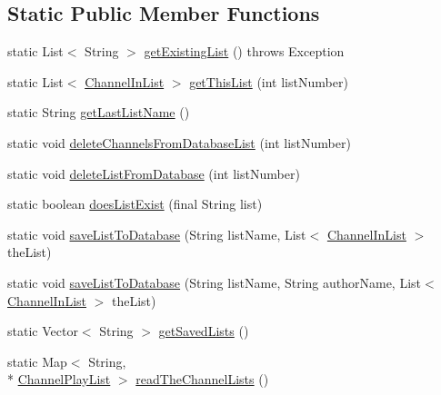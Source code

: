 \subsection*{Static Public Member Functions}
\begin{DoxyCompactItemize}
\item 
static List$<$ String $>$ \hyperlink{classgov_1_1fnal_1_1ppd_1_1dd_1_1db_1_1ListUtilsDatabase_afb004a01d8a3d02efaaa50ed734b0564}{get\-Existing\-List} ()  throws Exception 
\item 
static List$<$ \hyperlink{interfacegov_1_1fnal_1_1ppd_1_1dd_1_1channel_1_1ChannelInList}{Channel\-In\-List} $>$ \hyperlink{classgov_1_1fnal_1_1ppd_1_1dd_1_1db_1_1ListUtilsDatabase_aee47d0141e92fe89e80a36b5a6a5cd04}{get\-This\-List} (int list\-Number)
\item 
static String \hyperlink{classgov_1_1fnal_1_1ppd_1_1dd_1_1db_1_1ListUtilsDatabase_a328b15f961d8325f5564b91d2bba7ead}{get\-Last\-List\-Name} ()
\item 
static void \hyperlink{classgov_1_1fnal_1_1ppd_1_1dd_1_1db_1_1ListUtilsDatabase_abaed6c93ac5b31e28158b84ec1d80986}{delete\-Channels\-From\-Database\-List} (int list\-Number)
\item 
static void \hyperlink{classgov_1_1fnal_1_1ppd_1_1dd_1_1db_1_1ListUtilsDatabase_a514d14190bbbb559a123956f472db983}{delete\-List\-From\-Database} (int list\-Number)
\item 
static boolean \hyperlink{classgov_1_1fnal_1_1ppd_1_1dd_1_1db_1_1ListUtilsDatabase_a6a89a828ee53dccda4455a61cf7ac94c}{does\-List\-Exist} (final String list)
\item 
static void \hyperlink{classgov_1_1fnal_1_1ppd_1_1dd_1_1db_1_1ListUtilsDatabase_a118a13c8c7f09f5625b7734089572b3f}{save\-List\-To\-Database} (String list\-Name, List$<$ \hyperlink{interfacegov_1_1fnal_1_1ppd_1_1dd_1_1channel_1_1ChannelInList}{Channel\-In\-List} $>$ the\-List)
\item 
static void \hyperlink{classgov_1_1fnal_1_1ppd_1_1dd_1_1db_1_1ListUtilsDatabase_a50bec4bb6b4a903951b19495c8390831}{save\-List\-To\-Database} (String list\-Name, String author\-Name, List$<$ \hyperlink{interfacegov_1_1fnal_1_1ppd_1_1dd_1_1channel_1_1ChannelInList}{Channel\-In\-List} $>$ the\-List)
\item 
static Vector$<$ String $>$ \hyperlink{classgov_1_1fnal_1_1ppd_1_1dd_1_1db_1_1ListUtilsDatabase_a1366b73c552ad9c88f917c44b8783bde}{get\-Saved\-Lists} ()
\item 
static Map$<$ String, \\*
\hyperlink{classgov_1_1fnal_1_1ppd_1_1dd_1_1channel_1_1ChannelPlayList}{Channel\-Play\-List} $>$ \hyperlink{classgov_1_1fnal_1_1ppd_1_1dd_1_1db_1_1ListUtilsDatabase_af146f2d05257db5fc6a7fa55cb230fb0}{read\-The\-Channel\-Lists} ()
\end{DoxyCompactItemize}


